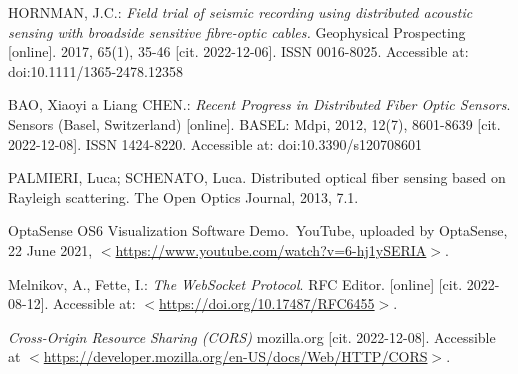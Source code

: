 \begin{thebibliography}{99}
HORNMAN, J.C.: \emph{Field trial of seismic recording using distributed acoustic sensing with broadside sensitive fibre-optic cables.} Geophysical Prospecting [online]. 2017, 65(1), 35-46 [cit. 2022-12-06]. ISSN 0016-8025. Accessible at: doi:10.1111/1365-2478.12358

BAO, Xiaoyi a Liang CHEN.: \emph{Recent Progress in Distributed Fiber Optic Sensors}. Sensors (Basel, Switzerland) [online]. BASEL: Mdpi, 2012, 12(7), 8601-8639 [cit. 2022-12-08]. ISSN 1424-8220. Accessible at: doi:10.3390/s120708601

PALMIERI, Luca; SCHENATO, Luca. Distributed optical fiber sensing based on Rayleigh scattering. The Open Optics Journal, 2013, 7.1.

OptaSense OS6 Visualization Software Demo. YouTube, uploaded by OptaSense, 22 June 2021, \(<\)\url{https://www.youtube.com/watch?v=6-hj1ySERIA}\(>\).

Melnikov, A., Fette, I.: \emph{The WebSocket Protocol}. RFC Editor. [online] [cit. 2022-08-12]. Accessible at: \(<\)\url{https://doi.org/10.17487/RFC6455}\(>\).

\emph{Cross-Origin Resource Sharing (CORS)} mozilla.org [cit. 2022-12-08]. Accessible at \(<\)\url{https://developer.mozilla.org/en-US/docs/Web/HTTP/CORS}\(>\).








\end{thebibliography}
